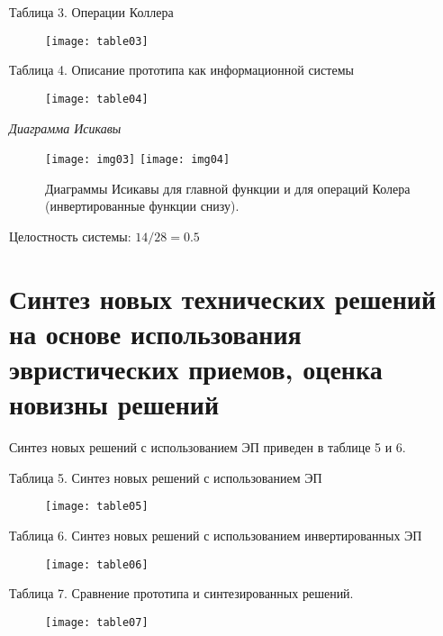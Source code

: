 Таблица 3. Операции Коллера
\begin{figure}[h!]
    \center
    \texttt{[image: table03]}
\end{figure}

\pagebreak

Таблица 4. Описание прототипа как информационной системы
\begin{figure}[h!]
    \center
    \texttt{[image: table04]}
\end{figure}

\newpage

\vspace{-1em}\emph{Диаграмма Исикавы}
\begin{figure}[h!]
    \center
    \texttt{[image: img03]}
    \texttt{[image: img04]}
    \caption{Диаграммы Исикавы для главной функции и для операций Колера (инвертированные функции снизу).}
\end{figure}

Целостность системы: \( 14 / 28 = 0.5 \)

\chapter{Синтез новых технических решений на основе использования эвристических приемов, 
    оценка новизны решений}
Синтез новых решений с использованием ЭП приведен в таблице 5 и 6.

Таблица 5. Синтез новых решений с использованием ЭП
\begin{figure}[h!]
    \center
    \texttt{[image: table05]}
\end{figure}

\pagebreak

Таблица 6. Синтез новых решений с использованием инвертированных ЭП
\begin{figure}[h!]
    \center
    \texttt{[image: table06]}
\end{figure}

\pagebreak

Таблица 7. Сравнение прототипа и синтезированных решений. 
\begin{figure}[h!]
    \center
    \texttt{[image: table07]}
\end{figure}

